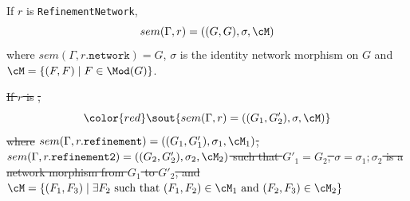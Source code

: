 \documentclass[10pt,fleqn,final]{scrreprt}
\newcommand*{\syntax}[1]{\texttt{#1}}
\providecommand{\DIFdel}[1]{{\protect\color{red}\sout{#1}}}                      %
\providecommand{\DIFdelbegin}{} %
\providecommand{\DIFdelend}{} %
\begin{document}
If $r$ is \syntax{RefinementNetwork},
$$sem(\Gamma, r) = ((G, G), \sigma, \cM)$$
\noindent 
where $sem(\Gamma, r.\syntax{network}) = G$,
$\sigma$ is the identity network morphism on $G$
and 
$\cM = \{ (F, F) \mid F \in \Mod(G)\}$.

\DIFdelbegin \DIFdel{If $r$ is }%
\DIFdel{,
}\begin{displaymath}\DIFdel{sem(\Gamma, r) = 
((G_1, G'_2), \sigma, \cM)}\end{displaymath}
\DIFdel{where}%
\DIFdel{$sem(\Gamma, r.\syntax{refinement}) = 
((G_1, G'_1), \sigma_1, \cM_1)$,
$sem(\Gamma, r.\syntax{refinement2}) = 
((G_2, G'_2), \sigma_2, \cM_2)$
such that $G'_1 = G_2$,
$\sigma = \sigma_1;\sigma_2$
is a network morphism from $G_1$ to $G'_2$, 
and
$\cM = \{(F_1, F_3) \mid \exists F_2 \text{ such that } 
(F_1, F_2) \in \cM_1  \text{ and }
(F_2, F_3) \in \cM_2  \}$
}\DIFdelend %
\end{document}
